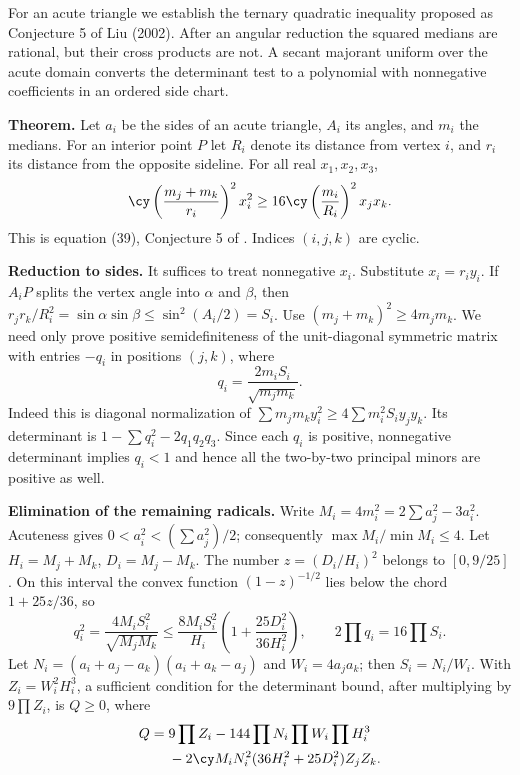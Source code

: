 \documentclass[11pt,a4paper]{article}
\numberwithin{equation}{section}
\theoremstyle{definition}
\theoremstyle{remark}
\newenvironment{sectionabstract}{\par\smallskip\begingroup\small\noindent}{\par\endgroup\medskip}
\begin{document}
\begin{sectionabstract}
For an acute triangle we establish the ternary quadratic inequality proposed as Conjecture 5 of Liu (2002). After an angular reduction the squared medians are rational, but their cross products are not. A secant majorant uniform over the acute domain converts the determinant test to a polynomial with nonnegative coefficients in an ordered side chart.
\end{sectionabstract}
\textbf{Theorem.} Let $a_i$ be the sides of an acute triangle, $A_i$ its angles, and $m_i$ the medians. For an interior point $P$ let $R_i$ denote its distance from vertex $i$, and $r_i$ its distance from the opposite sideline. For all real $x_1,x_2,x_3$,
\[
 \cy\left(\frac{m_j+m_k}{r_i}\right)^2 x_i^2
 \ge 16\cy\left(\frac{m_i}{R_i}\right)^2 x_jx_k.
\]
This is equation (39), Conjecture 5 of \cite{r45keio:liu}. Indices $(i,j,k)$ are cyclic.

\textbf{Reduction to sides.} It suffices to treat nonnegative $x_i$. Substitute $x_i=r_i y_i$. If $A_iP$ splits the vertex angle into $\alpha$ and $\beta$, then
$r_jr_k/R_i^2=\sin\alpha\sin\beta\le\sin^2(A_i/2)=S_i$. Use $(m_j+m_k)^2\ge4m_jm_k$. We need only prove positive semidefiniteness of the unit-diagonal symmetric matrix with entries $-q_i$ in positions $(j,k)$, where
\[
 q_i=\frac{2m_iS_i}{\sqrt{m_jm_k}}.
\]
Indeed this is diagonal normalization of
$\sum m_jm_k y_i^2\ge4\sum m_i^2 S_i y_jy_k$. Its determinant is $1-\sum q_i^2-2q_1q_2q_3$. Since each $q_i$ is positive, nonnegative determinant implies $q_i<1$ and hence all the two-by-two principal minors are positive as well.

\textbf{Elimination of the remaining radicals.} Write $M_i=4m_i^2=2\sum a_j^2-3a_i^2$. Acuteness gives $0<a_i^2<(\sum a_j^2)/2$; consequently $\max M_i/\min M_i\le4$. Let $H_i=M_j+M_k$, $D_i=M_j-M_k$. The number $z=(D_i/H_i)^2$ belongs to $[0,9/25]$. On this interval the convex function $(1-z)^{-1/2}$ lies below the chord $1+25z/36$, so
\[
 q_i^2=\frac{4M_iS_i^2}{\sqrt{M_jM_k}}
 \le \frac{8M_iS_i^2}{H_i}\left(1+\frac{25D_i^2}{36H_i^2}\right),
 \qquad 2\prod q_i=16\prod S_i.
\]
Let $N_i=(a_i+a_j-a_k)(a_i+a_k-a_j)$ and $W_i=4a_ja_k$; then $S_i=N_i/W_i$. With $Z_i=W_i^2 H_i^3$, a sufficient condition for the determinant bound, after multiplying by $9\prod Z_i$, is $Q\ge0$, where
\begin{align*}
 Q={}&9\prod Z_i-144\prod N_i\prod W_i\prod H_i^3\\
 &-2\cy M_iN_i^2(36H_i^2+25D_i^2)Z_jZ_k .
\end{align*}
\end{document}
